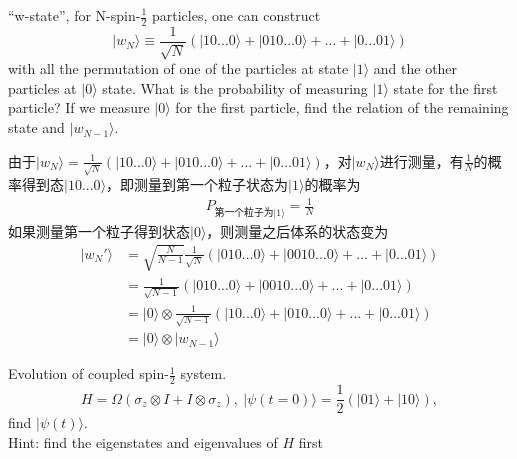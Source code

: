 \documentclass[UTF8,12pt]{article} %
\makeatletter
\newenvironment{proof}[1][\protect\proofname]{\par
\normalfont\topsep6\p@\@plus6\p@\relax
\trivlist
\itemindent\parindent
\item[\hskip\labelsep
\scshape
#1]\ignorespaces
}{%
\endtrivlist\@endpefalse
}
\renewcommand{\proofname}{\it{Solution}}
\makeatother
\begin{document}
\begin{exercise}{}{}
``w-state'', for N-spin-$\frac{1}{2}$ particles, one can construct
$$|w_{N}\rangle \equiv \frac{1}{\sqrt{N}}(|10...0\rangle + |010...0\rangle + ... + |0...01\rangle)$$
with all the permutation of one of the particles at state $|1\rangle$ and the other particles at $|0\rangle$ state. What is the probability of measuring $|1\rangle$ state for the first particle? If we measure $|0\rangle$ for the first particle, find the relation of the remaining state and $|w_{N-1}\rangle$.
\end{exercise}

\begin{proof}[解]
由于$|w_{N}\rangle = \frac{1}{\sqrt{N}}(|10...0\rangle + |010...0\rangle + ... + |0...01\rangle)$，对$|w_{N}\rangle$进行测量，有$\frac{1}{N}$的概率得到态$|10...0\rangle$，即测量到第一个粒子状态为$|1\rangle$的概率为
\begin{align}
P_{\text{第一个粒子为}|1\rangle} = \frac{1}{N}
\end{align}
如果测量第一个粒子得到状态$|0\rangle$，则测量之后体系的状态变为
\begin{align}
|w_{N}'\rangle &= \sqrt{\frac{N}{N-1}} \frac{1}{\sqrt{N}}(|010...0\rangle + |0010...0\rangle + ... + |0...01\rangle) \\
&= \frac{1}{\sqrt{N-1}}(|010...0\rangle + |0010...0\rangle + ... + |0...01\rangle) \\
&= |0\rangle \otimes \frac{1}{\sqrt{N-1}}(|10...0\rangle + |010...0\rangle + ... + |0...01\rangle) \\
&= |0\rangle \otimes |w_{N-1}\rangle
\end{align}
\end{proof}


\begin{exercise}{}{}
Evolution of coupled spin-$\frac{1}{2}$ system.
$$H = \Omega(\sigma_{z}\otimes I + I\otimes \sigma_{z}),~ |\psi(t=0)\rangle = \frac{1}{2}(|01\rangle + |10\rangle),$$
find $|\psi(t)\rangle$.\\
Hint: find the eigenstates and eigenvalues of $H$ first
\end{exercise}
\end{document}
